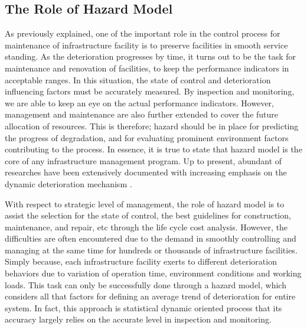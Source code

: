 \subsection{The Role of Hazard Model}
\label{222}
As previously explained, one of the important role in the control process for maintenance of infrastructure facility is to preserve facilities in smooth service standing. As the deterioration progresses by time, it turns out to be the task for maintenance and renovation of facilities, to keep the performance indicators in acceptable ranges. In this situation, the state of control and deterioration influencing factors must be accurately measured. By inspection and monitoring, we are able to keep an eye on the actual performance indicators. However, management and maintenance are also further extended to cover the future allocation of resources. This is therefore; hazard should be in place for predicting the progress of degradation, and for evaluating prominent environment factors contributing to the process. In essence, it is true to state that hazard model is the core of any infrastructure management program. Up to present, abundant of researches have been extensively documented with increasing emphasis on the dynamic deterioration mechanism \cite{kagi,kobami,tutu2,ono,qi,saeki}.

With respect to strategic level of management, the role of hazard model is to assist the selection for the state of control, the best guidelines for construction, maintenance, and repair, etc through the life cycle cost analysis. However, the difficulties are often encountered due to the demand in smoothly controlling and managing at the same time for hundreds or thousands of infrastructure facilities. Simply because, each infrastructure facility exerts to different deterioration behaviors due to variation of operation time, environment conditions and working loads. This task can only be successfully done through a hazard model, which considers all that factors for defining an average trend of deterioration for entire system. In fact, this approach is statistical dynamic oriented process that its accuracy largely relies on the accurate level in inspection and monitoring.


